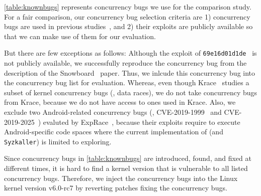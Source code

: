 



%
\autoref{table:knownbugs} represents concurrency bugs we use for the
comparison study.
%
For a fair comparison, our concurrency bug selection criteria are 1)
concurrency bugs are used in previous studies~\cite{exprace, razzer,
  snowboard, moonshine, fuze}, and 2) their exploits are publicly
available so that we can make use of them for our evaluation.

But there are few exceptions as follows: Although the exploit of
\texttt{69e16d01d1de}~\cite{snowboardbug} is not publicly available,
we successfully reproduce the concurrency bug from the description of
the Snowboard~\cite{snowboard} paper. Thus, we inlcude this
concurrency bug into the concurrency bug list for evaluation.
%
Whereas, even though Krace~\cite{krace} studies a subset of kernel
concurrency bugs (\ie, data races), we do not take concurrency bugs
from Krace, because we do not have access to ones used in Krace.
%
Also, we exclude two Android-related concurrency bugs (\ie,
CVE-2019-1999~\cite{cve20191999} and CVE-2019-2025~\cite{cve20192025})
evaluted by ExpRace~\cite{exprace}, because their exploits require to
execute Android-specific code spaces where the current implementation
of \sys (and \texttt{Syzkaller}) is limited to exploring.



%
Since concurrency bugs in \autoref{table:knownbugs} are introduced,
found, and fixed at different times, it is hard to find a kernel
version that is vulnerable to all listed concurrency bugs.
%
Therefore, we inject the concurrency bugs into the Linux kernel
version v6.0-rc7 by reverting patches fixing the concurrency bugs.



